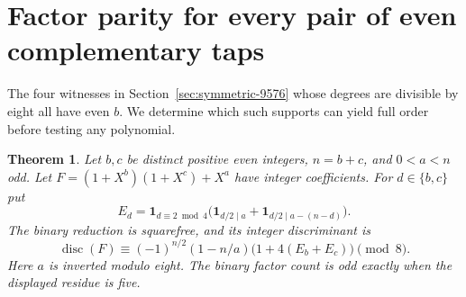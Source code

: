 \documentclass[11pt]{article}
\newtheorem{theorem}{Theorem}
\begin{document}
\section{Factor parity for every pair of even complementary taps}
\label{sec:complementary-discriminant}
The four witnesses in Section~\ref{sec:symmetric-9576} whose degrees
are divisible by eight all have even \(b\). We determine which such
supports can yield full order before testing any polynomial.

\begin{theorem}\label{thm:complementary-discriminant}
Let \(b,c\) be distinct positive even integers, \(n=b+c\), and
\(0<a<n\) odd. Let \(F=(1+X^b)(1+X^c)+X^a\) have integer
coefficients. For \(d\in\{b,c\}\) put
\[
 E_d=\mathbf1_{d\equiv2\bmod4}
 \bigl(\mathbf1_{d/2\mid a}+\mathbf1_{d/2\mid a-(n-d)}\bigr).
\]
The binary reduction is squarefree, and its integer discriminant is
\[
 \operatorname{disc}(F)\equiv(-1)^{n/2}(1-n/a)
                        \bigl(1+4(E_b+E_c)\bigr)\pmod8 .
\]
Here \(a\) is inverted modulo eight. The binary factor count is odd
exactly when the displayed residue is five.
\end{theorem}
\end{document}
